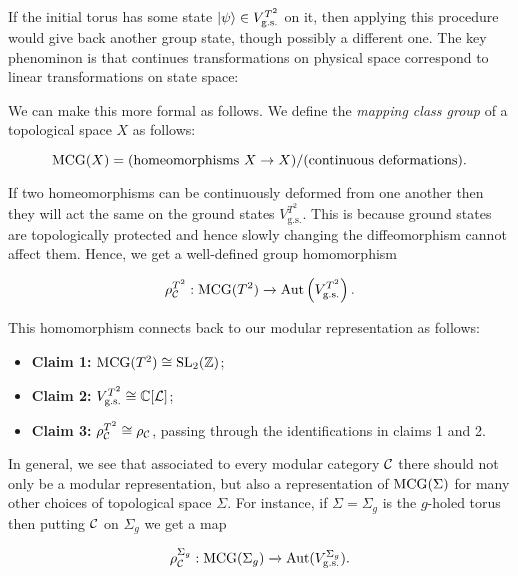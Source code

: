 
If the initial torus has some state $\ket{\psi}\in V_{\text{g.s.}}^{T^2}$ on it, then applying this procedure would give back another group state, though possibly a different one. The key phenominon is that continues transformations on physical space correspond to linear transformations on state space:


We can make this more formal as follows. We define the {\em mapping class group} of a topological space $X$ as follows:

$$\operatorname{MCG}(X)=(\text{homeomorphisms $X\to X$})/(\text{continuous deformations}).$$

If two homeomorphisms can be continuously deformed from one another then they will act the same on the ground states $V_{\text{g.s.}}^{T^2}$. This is because ground states are topologically protected and hence slowly changing the diffeomorphism cannot affect them. Hence, we get a well-defined group homomorphism

$$\rho_{{\mathcal C}}^{T^2}:\operatorname{MCG}(T^2)\xrightarrow{}\operatorname{Aut}\left(V_{\text{g.s.}}^{T^2}\right).$$

This homomorphism connects back to our modular representation as follows:

\begin{itemize}
\item \textbf{Claim 1:} $\operatorname{MCG}(T^2)\cong \operatorname{SL}_2({\mathbb Z})$;

\item \textbf{Claim 2:} $V_{\text{g.s.}}^{T^2}\cong {\mathbb C}[{\mathcal L}]$;

\item \textbf{Claim 3:} $\rho_{{\mathcal C}}^{T^2}\cong \rho_{{\mathcal C}}$, passing through the identifications in claims 1 and 2.
\end{itemize}

In general, we see that associated to every modular category ${\mathcal C}$ there should not only be a modular representation, but also a representation of $\operatorname{MCG}(\Sigma)$ for many other choices of topological space $\Sigma$. For instance, if $\Sigma=\Sigma_g$ is the $g$-holed torus then putting ${\mathcal C}$ on $\Sigma_g$ we get a map

$$\rho_{{\mathcal C}}^{\Sigma_g}:\operatorname{MCG}(\Sigma_g)\xrightarrow{}\operatorname{Aut}(V_{\text{g.s.}}^{\Sigma_g}).$$


